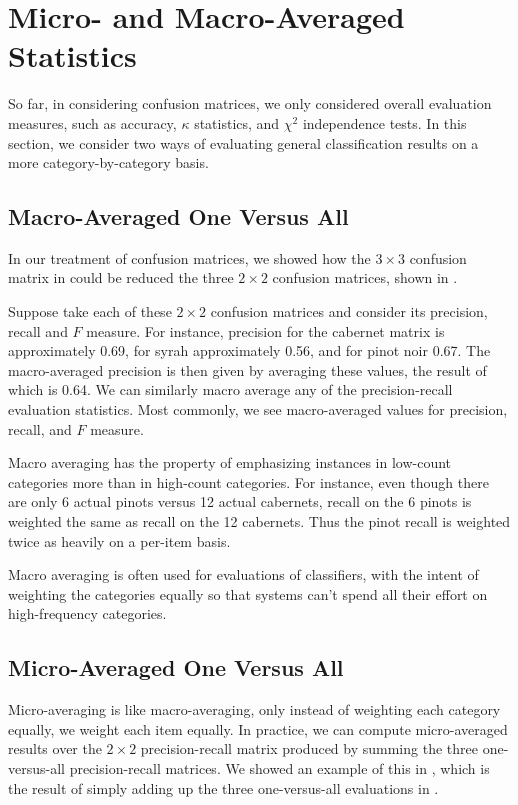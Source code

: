 \section{Micro- and Macro-Averaged Statistics}

So far, in considering confusion matrices, we only considered overall
evaluation measures, such as accuracy, $\kappa$ statistics, and
$\chi^2$ independence tests.  In this section, we consider two 
ways of evaluating general classification results on a more
category-by-category basis.

\subsection{Macro-Averaged One Versus All}

In our treatment of confusion matrices, we showed how the $3 \times 3$
confusion matrix in  could be reduced the
three $2 \times 2$ confusion matrices, shown in
.

Suppose take each of these $2 \times 2$ confusion matrices and
consider its precision, recall and $F$ measure.  For instance,
precision for the cabernet matrix is approximately 0.69, for syrah
approximately 0.56, and for pinot noir 0.67.  The macro-averaged
precision is then given by averaging these values, the result of which
is 0.64.  We can similarly macro average any of the precision-recall
evaluation statistics.  Most commonly, we see macro-averaged values
for precision, recall, and $F$ measure.

Macro averaging has the property of emphasizing instances in low-count
categories more than in high-count categories.  For instance, even
though there are only 6 actual pinots versus 12 actual cabernets,
recall on the 6 pinots is weighted the same as recall on the 12
cabernets.  Thus the pinot recall is weighted twice as heavily
on a per-item basis.

Macro averaging is often used for evaluations of classifiers, with the
intent of weighting the categories equally so that systems can't spend
all their effort on high-frequency categories.


\subsection{Micro-Averaged One Versus All}

Micro-averaging is like macro-averaging, only instead of weighting
each category equally, we weight each item equally.  In practice, we
can compute micro-averaged results over the $2 \times 2$
precision-recall matrix produced by summing the three one-versus-all
precision-recall matrices.  We showed an example of this in
, which is the result of simply adding up the
three one-versus-all evaluations in
.

